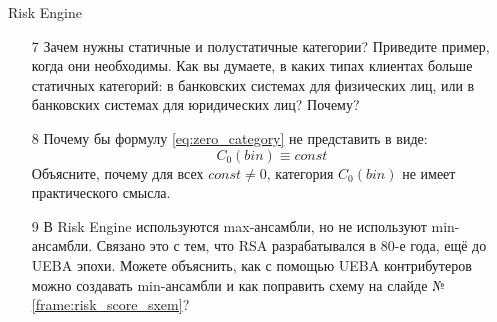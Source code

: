 \begin{frame}{Risk Engine}
	\small
	\begin{enumerate}
		\item[7] Зачем нужны статичные и полустатичные категории? Приведите пример, когда они необходимы.
		Как вы думаете, в каких типах клиентах больше статичных категорий: в банковских системах для физических лиц, или в банковских системах для юридических лиц? Почему?
		\item[8] Почему бы формулу \eqref{eq:zero_category} не представить в виде:
		\begin{equation*}
		C_0 (bin) \equiv const
		\end{equation*}
		Объясните, почему для всех $const \neq 0$, категория $C_0 (bin)$ не имеет практического смысла.
		\item[9] В Risk Engine используются max-ансамбли, но не используют min-ансамбли. 
		Связано это с тем, что RSA разрабатывался в 80-е года, ещё до UEBA эпохи. 
		Можете объяснить, как с помощью UEBA контрибутеров можно создавать min-ансамбли 
		и как поправить схему на слайде №\ref{frame:risk_score_sxem}?
	\end{enumerate}
\end{frame}




